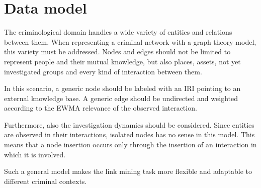 \section{Data model}
\label{sec:data-model}

The criminological domain handles a wide variety of entities and relations between them.
When representing a criminal network with a graph theory model, this variety must be addressed.
Nodes and edges should not be limited to represent people and their mutual knowledge, but also places, assets, not yet investigated groups and every kind of interaction between them. 

In this scenario, a generic node should be labeled with an IRI pointing to an external knowledge base.
A generic edge should be undirected and weighted according to the EWMA  relevance of the observed interaction. 

Furthermore, also the investigation dynamics should be considered. Since entities are observed in their interactions, isolated nodes has no sense in this model. This means that a node insertion occurs only through the insertion of an interaction in which it is involved.

Such a general model makes the link mining task more flexible and adaptable to different criminal contexts.